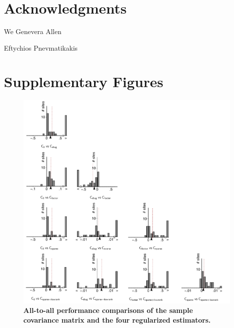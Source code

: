 \documentclass[10pt]{article}
\begin{document}
\section*{Acknowledgments}
We Genevera Allen

Eftychios Pnevmatikakis 




\newpage
\section*{Supplementary Figures}
\setcounter{figure}{0}
\begin{figure}[!ht]
\begin{center}
\includegraphics{./figures/Figure-Supp01.pdf}
\end{center}
\caption{{\bf All-to-all performance comparisons of the sample covariance matrix and the four regularized estimators.}
}
\label{supp:01}
\end{figure}
\end{document}
